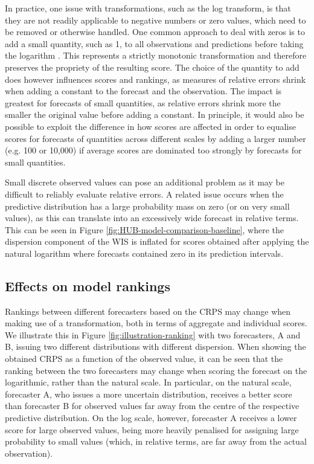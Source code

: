 \documentclass{article}
\begin{document}
In practice, one issue with transformations, such as the log transform, is that they are not readily applicable to negative numbers or zero values, which need to be removed or otherwise handled. 
One common approach to deal with zeros is to add a small quantity, such as 1, to all observations and predictions before taking the logarithm \citep{bellegoDealingLogsZeros2022}. This represents a strictly monotonic transformation and therefore preserves the propriety of the resulting score. The choice of the quantity to add does however influences scores and rankings, as measures of relative errors shrink when adding a constant to the forecast and the observation. The impact is greatest for forecasts of small quantities, as relative errors shrink more the smaller the original value before adding a constant. In principle, it would also be possible to exploit the difference in how scores are affected in order to equalise scores for forecasts of quantities across different scales by adding a larger number (e.g. 100 or 10,000) if average scores are dominated too strongly by forecasts for small quantities. 

Small discrete observed values can pose an additional problem as it may be difficult to reliably evaluate relative errors. A related issue occurs when the predictive distribution has a large probability mass on zero (or on very small values), as this can translate into an excessively wide forecast in relative terms. This can be seen in Figure \ref{fig:HUB-model-comparison-baseline}, where the dispersion component of the WIS is inflated for scores obtained after applying the natural logarithm where forecasts contained zero in its prediction intervals. 

\subsection{Effects on model rankings}
\label{sec:methods:rankings}
Rankings between different forecasters based on the CRPS may change when making use of a transformation, both in terms of aggregate and individual scores. We illustrate this in Figure \ref{fig:illustration-ranking} with two forecasters, A and B, issuing two different distributions with different dispersion. When showing the obtained CRPS as a function of the observed value, it can be seen that the ranking between the two forecasters may change when scoring the forecast on the logarithmic, rather than the natural scale. In particular, on the natural scale, forecaster A, who issues a more uncertain distribution, receives a better score than forecaster B for observed values far away from the centre of the respective predictive distribution. On the log scale, however, forecaster A receives a lower score for large observed values, being more heavily penalised for assigning large probability to small values (which, in relative terms, are far away from the actual observation). 
\end{document}
